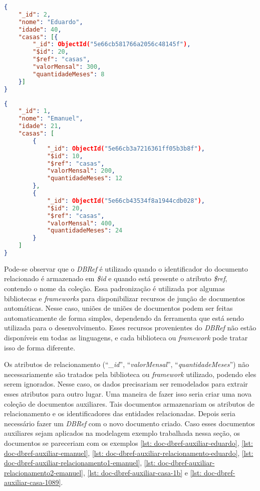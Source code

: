 
\begin{lstlisting}[language=json, caption={Documento da Pessoa \textit{Eduardo} com \textit{DBRef}\label{lst: doc-dbref-eduardo}}]
{
    "_id": 2,
    "nome": "Eduardo",
    "idade": 40,
    "casas": [{
        "_id": ObjectId("5e66cb581766a2056c48145f"),
        "$id": 20,
        "$ref": "casas",
        "valorMensal": 300,
        "quantidadeMeses": 8
    }]
}
\end{lstlisting}


\begin{lstlisting}[language=json, caption={Documento da Pessoa \textit{Emanuel} com \textit{DBRef}\label{lst: doc-dbref-emanuel}}]
{
    "_id": 1,
    "nome": "Emanuel",
    "idade": 21,
    "casas": [
        {
            "_id": ObjectId("5e66cb3a7216361ff05b3b8f"),
            "$id": 10,
            "$ref": "casas",
            "valorMensal": 200,
            "quantidadeMeses": 12
        },
        {
            "_id": ObjectId("5e66cb43534f8a1944cdb028"),
            "$id": 20,
            "$ref": "casas",
            "valorMensal": 400,
            "quantidadeMeses": 24
        }
    ]
}
\end{lstlisting}

Pode-se observar que o \textit{DBRef} é utilizado quando o identificador do documento relacionado é armazenado em \textit{\$id} e quando está presente o atributo \textit{\$ref}, contendo o nome da coleção. Essa padronização é utilizada por algumas bibliotecas e \textit{frameworks} para disponibilizar recursos de junção de documentos automáticas. Nesse caso, uniões de uniões de documentos podem ser feitas automaticamente de forma simples, dependendo da ferramenta que está sendo utilizada para o desenvolvimento. Esses recursos provenientes do \textit{DBRef} não estão disponíveis em todas as linguagens, e cada biblioteca ou \textit{framework} pode tratar isso de forma diferente.

Os atributos de relacionamento (``\textit{\_id}'', ``\textit{valorMensal}'', ``\textit{quantidadeMeses}'') não necessariamente são tratados pela biblioteca ou \textit{framework} utilizado, podendo eles serem ignorados. Nesse caso, os dados precisariam ser remodelados para extrair esses atributos para outro lugar. Uma maneira de fazer isso seria criar uma nova coleção de documentos auxiliares. Tais documentos armazenariam os atributos de relacionamento e os identificadores das entidades relacionadas. Depois seria necessário fazer um \textit{DBRef} com o novo documento criado. Caso esses documentos auxiliares sejam aplicados na modelagem exemplo trabalhada nessa seção, os documentos se pareceriam com os exemplos \ref{lst: doc-dbref-auxiliar-eduardo}, \ref{lst: doc-dbref-auxiliar-emanuel}, \ref{lst: doc-dbref-auxiliar-relacionamento-eduardo}, \ref{lst: doc-dbref-auxiliar-relacionamento1-emanuel}, \ref{lst: doc-dbref-auxiliar-relacionamento2-emanuel}, \ref{lst: doc-dbref-auxiliar-casa-1b} e \ref{lst: doc-dbref-auxiliar-casa-1089}.

